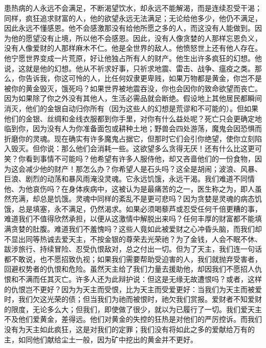 患热病的人永远不会满足，不断渴望饮水，却永远不能解渴，而是连续忍受干渴；同样，疯狂追求财富的人，他的欲望永远无法满足；无论给他多少，他仍不满足，因此永远不懂感恩。他不会感激那没有给他所愿之多的人，而这没有人能做到。因为他的愿望没有止境，所以他不会感恩。因此，没有人像贪婪的人那样忘恩负义，没有人像爱财的人那样麻木不仁。他是全世界的敌人。他愤怒世上还有他人存在。他宁愿世界变成一片荒原，好让他独占所有人的财产。他生出许多疯狂的幻想。他说，这就是他的幻想。他从不祈求好事，只祈求地震、雷击、战争、瘟疫之类。那么，你告诉我，你这可怜的人，比任何奴隶更卑贱，如果万物都是黄金，你岂不是被你的黄金毁灭，饿死吗？如果世界被地震吞没，你也会因你的致命欲望而丧亡。因为如果除了你之外没有其他人，生活必需品就会断绝。假设地上其他居民都瞬间消灭，他们的金银自动归你所有（因为这些人的幻想是荒谬和不可能的）。但如果他们的金银、丝绸和金线衣服都到你手里，对你有什么益处呢？死亡只会更确定地临到你，因为没有人为你准备面包或耕种土地；野兽会四处游荡，魔鬼会因恐惧而折磨你的灵魂。现在确实有许多魔鬼占据它，但那时它们会引你绝望，使你立刻陷入毁灭。但你说：那么他们会消耗一些。这欲望多么贪得无厌！还有什么比这更可笑？你看到事情不可能吗？他希望有许多人服侍他，却又吝啬他们的一份食物，因为这会减少他的财产！那怎么办？你希望人是石头吗？这全是胡闹；波浪、风暴、巨浪、剧烈的动荡和暴风雨淹没灵魂。它永远饥饿，永远干渴。我们难道不同情他、为他哀伤吗？在身体疾病中，这被认为是最痛苦的之一，医生称之为，即人虽然充满，却总是饥饿。灵魂中同样的紊乱不是更可悲吗？因为贪婪是灵魂的病态饥饿，总是填塞，永不满足，仍然渴求。如果必须喝藜芦或忍受任何千倍更糟的事，难道我们不值得欣然承担，以便从这激情中解脱出来吗？任何丰厚的财富都不能填满贪婪的肚腹。难道我们不羞愧吗？这些人竟如此被爱财之心冲昏头脑，而我们却不显出同等热诚去爱天主，不按金银的尊荣去光荣祂？为了金钱，人会不眠不休、跋涉旅行、持续冒险、忍受仇恨敌对，总之付出一切。但为了天主，我们连一句话都不敢说，也不愿招致仇视；如果我们需要帮助受迫害的人，我们就抛弃受害者，回避权势者的仇恨和危险。虽然天主给了我们力量去援助他，却因我们不愿招人仇恨和不满而任其灭亡。许多人还为此辩护说：但这是无缘无故遭恨吗？或者，这样的仇恨岂不更好？因为为天主而受恨，比为天主而受爱更好：当我们为天主而被爱时，我们欠这光荣的债；但当我们为祂而被恨时，祂欠我们赏报。爱财者不知爱财的限度，无论多么大；但我们，即使做了很少，就以为已履行了一切。我们爱天主不及他们爱黄金，差得远。他们对黄金的失控的狂热是对他们的严厉控诉。而我们没有为天主如此疯狂，这是对我们的定罪；我们没有将如此之多的爱献给万有的主，如同他们献给尘土一般，因为矿中挖出的黄金并不更好。\par

